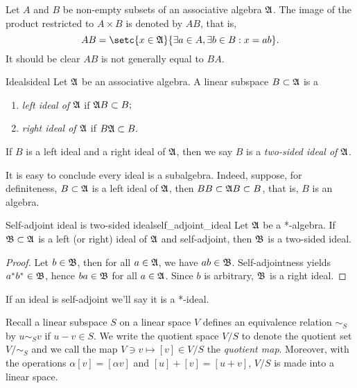 Let \(A\) and \(B\) be non-empty subsets of an associative algebra \(\mathfrak{A}\). The image of the product restricted to \(A \times B\) is denoted by \(AB\), that is,
\begin{equation*}
    AB = \setc{x \in \algebra{A}}{\exists a \in A, \exists b \in B : x = ab}.
\end{equation*}
It should be clear \(AB\) is not generally equal to \(BA\).
\begin{definition}{Ideals}{ideal}
    Let \(\mathfrak{A}\) be an associative algebra. A linear subspace \(B \subset \mathfrak{A}\) is a
    \begin{enumerate}[label=(\alph*)]
        \item \emph{left ideal of \(\mathfrak{A}\)} if \(\mathfrak{A}B \subset B;\)
        \item \emph{right ideal of \(\mathfrak{A}\)} if \(B\mathfrak{A} \subset B.\)
    \end{enumerate}
    If \(B\) is a left ideal and a right ideal of \(\mathfrak{A}\), then we say \(B\) is a \emph{two-sided ideal of \(\mathfrak{A}\)}.
\end{definition}
\begin{remark}
    It is easy to conclude every ideal is a subalgebra. Indeed, suppose, for definiteness, \(B \subset \mathfrak{A}\) is a left ideal of \(\mathfrak{A}\), then \(BB \subset \mathfrak{A}B \subset B\), that is, \(B\) is an algebra.
\end{remark}
\begin{proposition}{Self-adjoint ideal is two-sided ideal}{self_adjoint_ideal}
    Let \(\mathfrak{A}\) be a *-algebra. If \(\mathfrak{B} \subset \mathfrak{A}\) is a left (or right) ideal of \(\mathfrak{A}\) and self-adjoint, then \(\mathfrak{B}\) is a two-sided ideal.
\end{proposition}
\begin{proof}
    Let \(b \in \mathfrak{B}\), then for all \(a \in \mathfrak{A}\), we have \(ab \in \mathfrak{B}\). Self-adjointness yields \(a^*b^* \in \mathfrak{B}\), hence \(ba \in \mathfrak{B}\) for all \(a \in \mathfrak{A}\). Since \(b\) is arbitrary, \(\mathfrak{B}\) is a right ideal.
\end{proof}
\begin{remark}
    If an ideal is self-adjoint we'll say it is a *-ideal.
\end{remark}

Recall a linear subspace \(S\) on a linear space \(V\) defines an equivalence relation \(\sim_S\) by \(u \sim_S v\) if \(u - v \in S\). We write the quotient space \(V/S\) to denote the quotient set \(V/\sim_S\) and we call the map \(V \ni v \mapsto [v] \in V/S\) the \emph{quotient map}. Moreover, with the operations \(\alpha[v] = [\alpha v]\) and \([u]+[v] = [u+v]\), \(V/S\) is made into a linear space.


